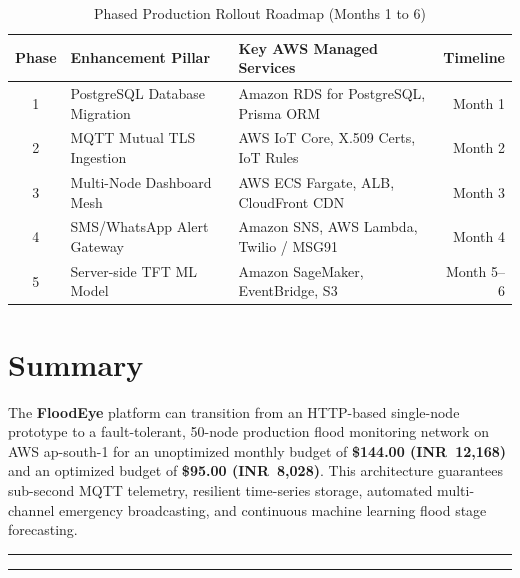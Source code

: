 \documentclass[11pt,a4paper]{article}
\begin{document}
\begin{table}[htbp]
\centering
\renewcommand{\arraystretch}{1.2}
\footnotesize
\begin{tabularx}{\linewidth}{c l X r}
\toprule
\textbf{Phase} & \textbf{Enhancement Pillar} & \textbf{Key AWS Managed Services} & \textbf{Timeline} \\
\midrule
1 & PostgreSQL Database Migration & Amazon RDS for PostgreSQL, Prisma ORM  & Month 1    \\
2 & MQTT Mutual TLS Ingestion     & AWS IoT Core, X.509 Certs, IoT Rules   & Month 2    \\
3 & Multi-Node Dashboard Mesh     & AWS ECS Fargate, ALB, CloudFront CDN   & Month 3    \\
4 & SMS/WhatsApp Alert Gateway    & Amazon SNS, AWS Lambda, Twilio / MSG91 & Month 4    \\
5 & Server-side TFT ML Model      & Amazon SageMaker, EventBridge, S3      & Month 5--6 \\
\bottomrule
\end{tabularx}
\caption{Phased Production Rollout Roadmap (Months 1 to 6)}
\label{tab:roadmap}
\end{table}

\section{Summary}

The \textbf{FloodEye} platform can transition from an HTTP-based single-node prototype to a fault-tolerant, 50-node production flood monitoring network on AWS ap-south-1 for an unoptimized monthly budget of \textbf{\$144.00 (INR~12,168)} and an optimized budget of \textbf{\$95.00 (INR~8,028)}. This architecture guarantees sub-second MQTT telemetry, resilient time-series storage, automated multi-channel emergency broadcasting, and continuous machine learning flood stage forecasting.

\vspace{10pt}
\begin{center}
  {\color{AWSOrg}\rule{0.35\linewidth}{1.5pt}}
  \quad
  {\color{FloodBlue}\rule{0.35\linewidth}{1.5pt}}
\end{center}
\end{document}
